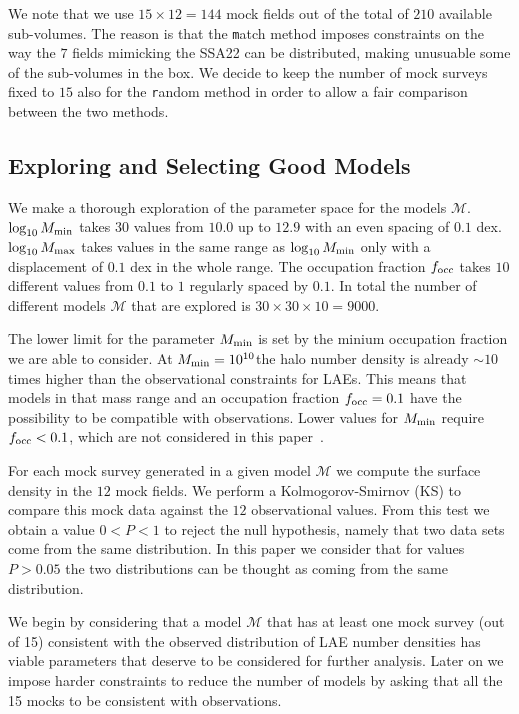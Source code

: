 \documentclass[usenatbib]{mn2e}
\newcommand{\documentname}{paper~}
\newcommand{\hMsun}{{\ifmmode{h^{-1}{\rm
        {M_{\odot}}}}\else{$h^{-1}{\rm{M_{\odot}}}$}\fi}}
\begin{document}
We note that we use $15\times 12=144$ mock fields out of the total of $210$
available sub-volumes. The reason is that the {\texttt match}
method imposes constraints on the way the $7$ fields mimicking the
SSA22 can be distributed, making unusuable some of the
sub-volumes in the box. We decide to keep the number of mock surveys
fixed to $15$ also for the {\texttt random} method in order to allow a
fair comparison between the two methods.




\subsection{Exploring and Selecting Good Models}

We make a thorough exploration of the parameter space for the models
${\mathcal M}$. $\log_{10} M_{\rm min}$ takes $30$ values from $10.0$ up
to $12.9$ with an even spacing of $0.1$ dex. $\log_{10} M_{\rm max}$
takes values in the same range as $\log_{10}M_{\rm min}$ only with a
displacement of $0.1$ dex in the whole range. The occupation fraction
$f_{\rm occ}$ takes $10$ different values from $0.1$ to $1$ regularly
spaced by $0.1$. In total the number of different models ${\mathcal
  M}$ that are explored is $30 \times 30 \times 10 = 9000$. 


The lower limit for the parameter $M_{\rm min}$ is set by the minium
occupation fraction we are able to consider. At $M_{\rm
  min}=10^{10}$\hMsun the halo number density is already $\sim 10$
times higher than the observational constraints for LAEs. This means
that models in that mass range and an occupation fraction $f_{\rm
  occ}=0.1$ have the possibility to be compatible with observations. Lower
values for $M_{\rm min}$ require $f_{\rm occ}<0.1$, which are not
considered in this \documentname. 

For each mock survey generated in a given model ${\mathcal M}$ we
compute the surface density in the $12$ mock fields. We perform a
Kolmogorov-Smirnov (KS) to compare this mock data against the $12$
observational values. From this test we obtain a value $0<P<1$ to
reject the null hypothesis, namely that two data sets come from the
same distribution. In this paper we consider that for values $P>0.05$
the two distributions can be thought as coming from the same
distribution.

We begin by considering that  a model ${\mathcal M}$ that has at least
one mock survey (out of 15) consistent with the observed
distribution of LAE number densities has viable parameters that
deserve to be considered for further analysis. Later on we impose
harder constraints to reduce the number of models by asking that all
the 15 mocks to be consistent with observations.
\end{document}
